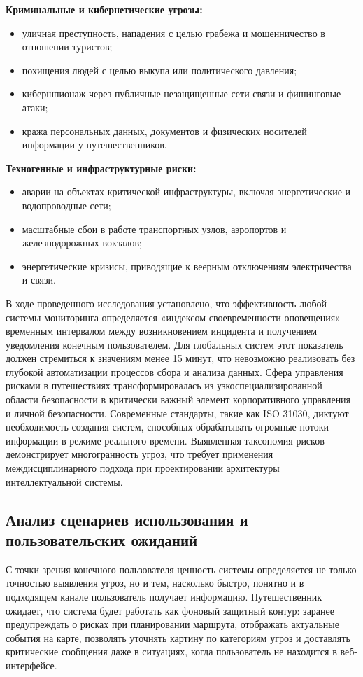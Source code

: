 \textbf{Криминальные и кибернетические угрозы:}
    \begin{itemize}
    \item уличная преступность, нападения с целью грабежа и мошенничество в отношении туристов;
    \item похищения людей с целью выкупа или политического давления;
    \item кибершпионаж через публичные незащищенные сети связи и фишинговые атаки;
    \item кража персональных данных, документов и физических носителей информации у путешественников.
    \end{itemize}
\textbf{Техногенные и инфраструктурные риски:}
    \begin{itemize}
    \item аварии на объектах критической инфраструктуры, включая энергетические и водопроводные сети;
    \item масштабные сбои в работе транспортных узлов, аэропортов и железнодорожных вокзалов;
    \item энергетические кризисы, приводящие к веерным отключениям электричества и связи.
    \end{itemize}

В ходе проведенного исследования установлено, что эффективность любой системы мониторинга определяется «индексом своевременности оповещения» — временным интервалом между возникновением инцидента и получением уведомления конечным пользователем. Для глобальных систем этот показатель должен стремиться к значениям менее 15 минут, что невозможно реализовать без глубокой автоматизации процессов сбора и анализа данных.
Сфера управления рисками в путешествиях трансформировалась из узкоспециализированной области безопасности в критически важный элемент корпоративного управления и личной безопасности. Современные стандарты, такие как ISO 31030\cite{iso_31030_bib}, диктуют необходимость создания систем, способных обрабатывать огромные потоки информации в режиме реального времени. Выявленная таксономия рисков демонстрирует многогранность угроз, что требует применения междисциплинарного подхода при проектировании архитектуры интеллектуальной системы.

\subsection{Анализ сценариев использования и пользовательских ожиданий}

С точки зрения конечного пользователя ценность системы определяется не только точностью выявления угроз, но и тем, насколько быстро, понятно и в подходящем канале пользователь получает информацию. Путешественник ожидает, что система будет работать как фоновый защитный контур: заранее предупреждать о рисках при планировании маршрута, отображать актуальные события на карте, позволять уточнять картину по категориям угроз и доставлять критические сообщения даже в ситуациях, когда пользователь не находится в веб-интерфейсе.

